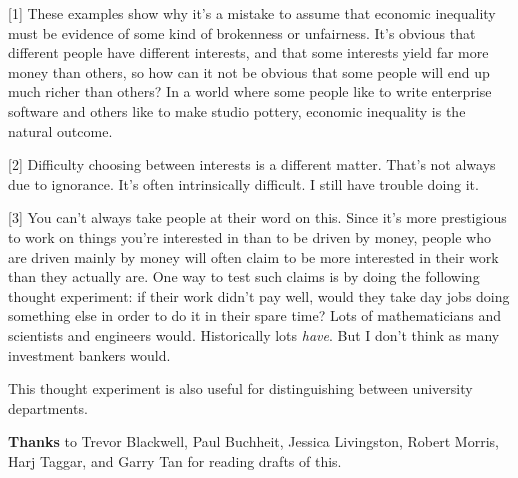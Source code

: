 [1]
These examples show why it's a mistake to assume that economic
inequality must be evidence of some kind of brokenness or unfairness.
It's obvious that different people have different interests, and
that some interests yield far more money than others, so how can
it not be obvious that some people will end up much richer than
others? In a world where some people like to write enterprise
software and others like to make studio pottery, economic inequality
is the natural outcome.

[2]
Difficulty choosing between interests is a different matter.
That's not always due to ignorance. It's often intrinsically
difficult. I still have trouble doing it.

[3]
You can't always take people at their word on this. Since
it's more prestigious to work on things you're interested in than
to be driven by money, people who are driven mainly by money will
often claim to be more interested in their work than they actually
are. One way to test such claims is by doing the following thought
experiment: if their work didn't pay well, would they take day jobs
doing something else in order to do it in their spare time? Lots
of mathematicians and scientists and engineers would. Historically
lots \emph{have}. But I don't think as many investment bankers would.

This thought experiment is also useful for distinguishing between
university departments.



\textbf{Thanks} to Trevor Blackwell, Paul Buchheit, 
Jessica Livingston,
Robert Morris, Harj Taggar, and Garry Tan for reading drafts of
this.




